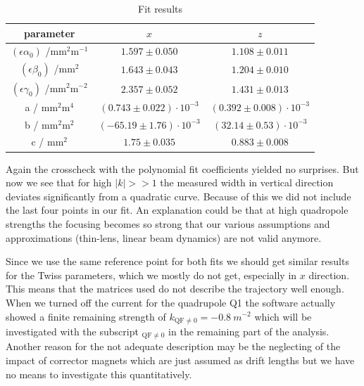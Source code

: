 \documentclass[11pt,a4paper,notitlepage]{scrartcl}
\begin{document}
\begin{table}[htbp]
	\centering
	\begin{tabular}{c||cc}
		parameter& $x$& $z$\\
		\hline
		\hline

		$(\epsilon\alpha_0)$ /$\si{\milli\m^2\m^{-1}}$ &$1.597\pm0.050$ & $1.108\pm0.011$\\
		$(\epsilon\beta_0)$ /$\si{\milli\m^2}$ &$1.643\pm0.043$ & $1.204\pm0.010$\\
		$(\epsilon\gamma_0)$ /$\si{\milli\m^2\m^{-2}}$ &$2.357\pm0.052$ &$1.431\pm0.013$\\
		
		
		\hline
		\hline

		a / $\si{\milli\m^2\m^4}$ &$(0.743\pm0.022)\cdot10^{-3}$ &$(0.392\pm0.008)\cdot10^{-3}$ \\
		b / $\si{\milli\m^2\m^2}$&$(-65.19\pm1.76)\cdot10^{-3}$ &$(32.14\pm0.53)\cdot10^{-3}$\\
		c / $\si{\milli\m^2}$ &$1.75\pm0.035$ &$0.883\pm0.008$\\
		
	\end{tabular}
	\caption{Fit results}
	\label{tab:fitres2}
\end{table}

Again the crosscheck with the polynomial fit coefficients yielded no surprises. But now we see that for high $|k|>>1$ the measured width in vertical direction deviates significantly from a quadratic curve. Because of this we did not include the last four points in our fit. An explanation could be that at high quadropole strengths the focusing becomes so strong that our various assumptions and approximations (thin-lens, linear beam dynamics) are not valid anymore. 

Since we use the same reference point for both fits we should get similar results for the Twiss parameters, which we mostly do not get, especially in $x$ direction. This means that the matrices used do not describe the trajectory well enough. When we turned off the current for the quadrupole Q1 the software actually showed a finite remaining strength of $k_{\text{QF}\neq0}=\SI{-0.8}{m^{-2}}$ which will be investigated with the subscript $_{\text{QF}\neq0}$ in the remaining part of the analysis. Another reason for the not adequate description may be the neglecting of the impact of corrector magnets which are just assumed as drift lengths but we have no means to investigate this quantitatively.
\end{document}
